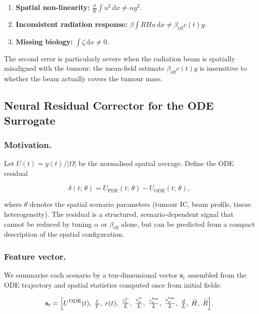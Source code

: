 \documentclass[runningheads]{llncs}
\begin{document}
\begin{enumerate}
\item \textbf{Spatial non-linearity:}
      $\tfrac{\rho}{K}\!\int u^2\,\mathrm{d}x \neq \alpha y^2$.
\item \textbf{Inconsistent radiation response:}
      $\beta\!\int R H u\,\mathrm{d}x \neq \beta_{\mathrm{eff}} c(t) y$.
\item \textbf{Missing biology:}
      $\int \zeta\,\mathrm{d}x \neq 0$.
\end{enumerate}

The second error is particularly severe when the radiation beam is spatially
misaligned with the tumour: the mean-field estimate $\beta_{\mathrm{eff}} c(t)y$
is insensitive to whether the beam actually covers the tumour mass.

\subsection{Neural Residual Corrector for the ODE Surrogate}
\label{sec:mlp}

\subsubsection{Motivation.}
Let $U(t) = y(t)/|\Omega|$ be the normalised spatial average.  Define the ODE
residual

\begin{equation}
    \delta(t;\,\theta) = U_{\mathrm{PDE}}(t;\,\theta) - U_{\mathrm{ODE}}(t;\,\theta),
\end{equation}

where $\theta$ denotes the spatial scenario parameters (tumour IC, beam profile,
tissue heterogeneity).  The residual is a structured, scenario-dependent signal
that cannot be reduced by tuning $\alpha$ or $\beta_{\mathrm{eff}}$ alone, but can
be predicted from a compact description of the spatial configuration.

\subsubsection{Feature vector.}
We summarise each scenario by a ten-dimensional vector $\mathbf{s}_t$ assembled from
the ODE trajectory and spatial statistics computed once from initial fields:

\begin{equation} \label{eq:features}
    \mathbf{s}_t = \Bigl[
        U^{\mathrm{ODE}}(t),\;
        \tfrac{t}{T},\;
        r(t),\;
        \tfrac{z^{\mathrm{ic}}_x}{L},\;
        \tfrac{z^{\mathrm{ic}}_y}{L},\;
        \tfrac{z^{\mathrm{bm}}_x}{L},\;
        \tfrac{z^{\mathrm{bm}}_y}{L},\;
        \tfrac{d}{L},\;
        \bar{H},\;
        \bar{R}
    \Bigr].
\end{equation}
\end{document}
